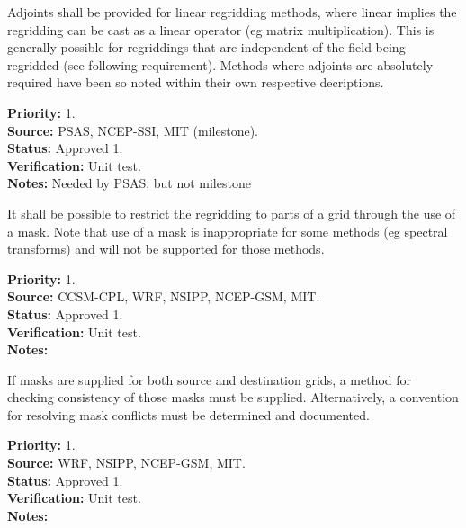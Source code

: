 
Adjoints shall be provided for linear regridding methods, where linear
implies the regridding can be cast as a linear operator (eg matrix 
multiplication). This is generally possible for regriddings that are 
independent of the field being regridded (see following requirement).
Methods where adjoints are absolutely required have been so noted within 
their own respective decriptions.

\begin{reqlist}
{\bf Priority:} 1. \\
{\bf Source:} PSAS, NCEP-SSI, MIT (milestone).\\
{\bf Status:} Approved 1. \\
{\bf Verification:} Unit test. \\
{\bf Notes:} Needed by PSAS, but not milestone
\end{reqlist}


It shall be possible to restrict the regridding to parts of a grid through 
the use of a mask.  Note that use of a mask is inappropriate for some methods 
(eg spectral transforms) and will not be supported for those methods.

\begin{reqlist}
{\bf Priority:} 1. \\
{\bf Source:} CCSM-CPL, WRF, NSIPP, NCEP-GSM, MIT. \\
{\bf Status:} Approved 1. \\
{\bf Verification:} Unit test. \\
{\bf Notes:} 
\end{reqlist}


If masks are supplied for both source and destination grids, a
method for checking consistency of those masks must be supplied.
Alternatively, a convention for resolving mask conflicts must
be determined and documented.

\begin{reqlist}
{\bf Priority:} 1. \\
{\bf Source:} WRF, NSIPP, NCEP-GSM, MIT. \\
{\bf Status:} Approved 1. \\
{\bf Verification:} Unit test. \\
{\bf Notes:} 
\end{reqlist}

